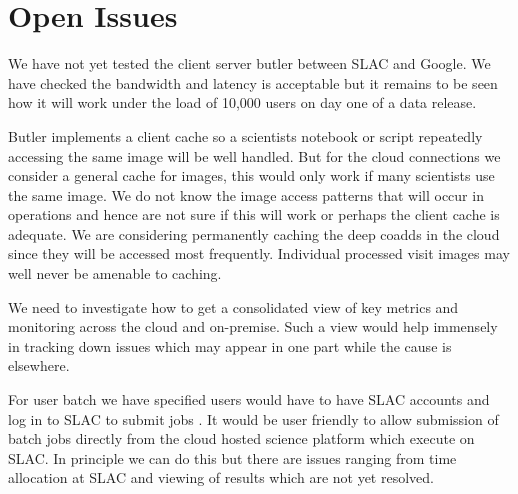 \section{Open Issues} \label{sec:open}

We have not yet tested the client server butler between SLAC and Google.
We have checked the bandwidth and latency is acceptable but it remains to be seen how it will work under the load of 10,000 users on day one of a data release.

Butler implements a client cache  so a scientists notebook or script  repeatedly accessing the same image will be well handled.
But for the cloud connections we consider a general cache for images,  this would only work if many scientists use the same image.
We do not know the image access patterns that will occur in operations and hence are not sure if this will work or perhaps the client cache is adequate.
We are considering permanently caching the deep coadds in the cloud since they will be accessed most frequently.
Individual processed visit images may well never be amenable to caching.

We need to investigate how to get a  consolidated view of key metrics and monitoring across the cloud and on-premise.
Such a view would help immensely in tracking down issues which may appear in one part while the cause is elsewhere.

For user batch we have specified users would have to have SLAC accounts and log in to SLAC to submit jobs \cite{DMTN-223}.
It would be user friendly to allow submission of batch jobs directly from the cloud hosted science platform which execute on SLAC.
In principle we can do this but there are issues ranging from time allocation at SLAC and viewing of results which are not yet resolved.
